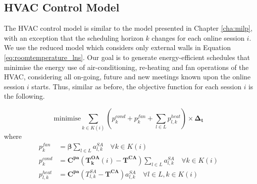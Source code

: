   
\subsection{HVAC Control Model} \label{sec:online_hvac_model}

The HVAC control model is similar to the model presented in Chapter \ref{cha:milp}, with an exception that the scheduling horizon $k$ changes for each online session $i$. We use the reduced model which considers only external walls in Equation \eqref{eq:roomtemperature_lns}. Our goal is to generate energy-efficient schedules that minimise the energy use of air-conditioning, re-heating and fan operations of the HVAC, considering all on-going, future and new meetings known upon the online session $i$ starts. Thus, similar as before, the objective function for each session $i$ is the following.

\begin{equation} 
\mbox{minimise} \sum_{k\in K(i)}  \left( p_{k}^{cond} + p_{k}^{fan} + \sum_{l \in L} p_{l,k}^{heat}\right) \times \bm{\Delta_t}
\end{equation}
where
\begin{align}
p_{k}^{fan} &= \bm{\beta} \sum_{l \in L} a_{l,k}^{SA} \quad  \forall k \in K(i) \label{eq:online:p_fan} \\
p_{k}^{cond} &= \bm{C^{pa}}\left(\bm{T_{k}^{OA}}(i) - \bm{T^{CA}}\right) \sum_{l \in L}  a_{l,k}^{SA} \quad \forall k \in K(i) \label{eq:online:p_cond} \\
p_{l,k}^{heat} &= \bm{C^{pa}} (T_{l,k}^{SA}- \bm{T^{CA}}) a_{l,k}^{SA} \quad \forall l \in L,k \in K(i) \label{eq:online:p_heat}
\end{align}


